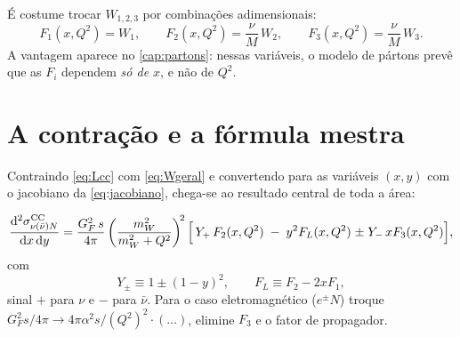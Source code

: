\documentclass[11pt,a4paper,oneside]{report}
\newcommand{\md}{\mathrm{d}}
\newcommand{\Qsq}{Q^{2}}
\begin{document}
\begin{definicao}
É costume trocar $W_{1,2,3}$ por combinações adimensionais:
\begin{equation}
  F_1(x,\Qsq) = W_1,\qquad
  F_2(x,\Qsq) = \frac{\nu}{M}\,W_2,\qquad
  F_3(x,\Qsq) = \frac{\nu}{M}\,W_3 .
\end{equation}
A vantagem aparece no \cref{cap:partons}: nessas variáveis, o modelo de pártons
prevê que as $F_i$ dependem \emph{só de $x$}, e não de $\Qsq$.
\end{definicao}

\section{A contração e a fórmula mestra}

Contraindo \cref{eq:Lcc} com \cref{eq:Wgeral} e convertendo para as variáveis
$(x,y)$ com o jacobiano da \cref{eq:jacobiano}, chega-se ao resultado central de
toda a área:

\begin{tcolorbox}[caixabase=acento,title={A fórmula mestra do DIS de corrente carregada}]
\begin{equation}
  \frac{\md^2\sigma^{\rm CC}_{\nu(\bar\nu)N}}{\md x\,\md y}
  = \frac{G_F^2\,s}{4\pi}
    \left(\frac{m_W^2}{m_W^2 + \Qsq}\right)^{\!2}
    \Big[\,Y_+\,F_2(x,\Qsq)\;-\;y^2 F_L(x,\Qsq)\;{\pm}\;Y_-\,xF_3(x,\Qsq)\Big],
  \label{eq:mestra}
\end{equation}
com
\begin{equation}
  Y_\pm \equiv 1 \pm (1-y)^2,
  \qquad
  F_L \equiv F_2 - 2xF_1 ,
\end{equation}
sinal $+$ para $\nu$ e $-$ para $\bar\nu$. Para o caso eletromagnético
($e^\pm N$) troque $G_F^2 s/4\pi \to 4\pi\alpha^2 s/(\Qsq)^{2}\cdot(\dots)$,
elimine $F_3$ e o fator de propagador.
\end{tcolorbox}
\end{document}
